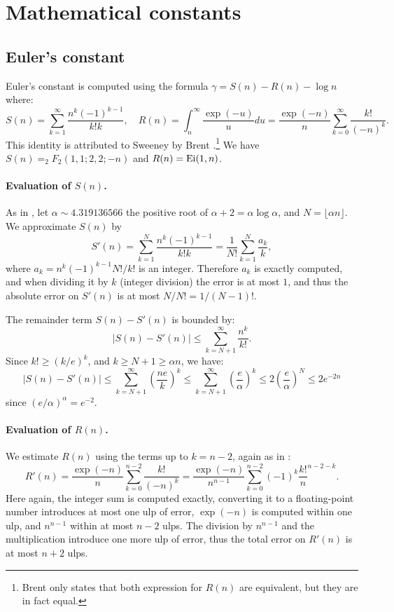 \documentclass[12pt]{amsart}
\begin{document}
\section{Mathematical constants}

\subsection{Euler's constant}

Euler's constant is computed using the formula $\gamma = S(n) - R(n) - \log n$
where:
\[ S(n) = \sum_{k=1}^{\infty} \frac{n^k (-1)^{k-1}}{k! k}, \quad
   R(n) = \int_n^{\infty} \frac{\exp(-u)}{u} du = \frac{\exp(-n)}{n}
	\sum_{k=0}^{\infty} \frac{k!}{(-n)^k}. \]
This identity is attributed to Sweeney by Brent \cite{Brent78}.\footnote{
Brent only states that both expression for $R(n)$ are equivalent, but
they are in fact equal.}
We have $S(n) = _2 F_2(1,1;2,2;-n)$ and $R(n) = {\rm Ei}(1, n)$.

\paragraph{Evaluation of $S(n)$.}
As in \cite{Brent78}, let $\alpha \sim 4.319136566$ the positive root
of $\alpha + 2 = \alpha \log \alpha$, and $N = \lfloor \alpha n \rfloor$.
We approximate $S(n)$ by
\[ S'(n) = \sum_{k=1}^{N} \frac{n^k (-1)^{k-1}}{k! k}
         = \frac{1}{N!} \sum_{k=1}^N \frac{a_k}{k}, \]
where $a_k = n^k (-1)^{k-1} N!/k!$ is an integer.
Therefore $a_k$ is exactly computed, and when dividing it by $k$
(integer division)
the error is at most $1$, and thus the absolute error on $S'(n)$ is
at most $N/N! = 1/(N-1)!$.

The remainder term $S(n) - S'(n)$ is bounded by:
\[ |S(n) - S'(n)| \le \sum_{k=N+1}^{\infty} \frac{n^k}{k!}. \]
Since $k! \ge (k/e)^k$, and $k \ge N+1 \ge \alpha n$, we have:
\[ |S(n) - S'(n)| \le \sum_{k=N+1}^{\infty} \left( \frac{n e}{k} \right)^k
                  \le \sum_{k=N+1}^{\infty} \left( \frac{e}{\alpha} \right)^k
                  \le 2 \left( \frac{e}{\alpha} \right)^N
                  \le 2 e^{-2n} \]
since $(e/\alpha)^{\alpha} = e^{-2}$.

\paragraph{Evaluation of $R(n)$.}
We estimate $R(n)$ using the terms up to $k=n-2$, again 
as in \cite{Brent78}:
\[ R'(n) = \frac{\exp(-n)}{n} \sum_{k=0}^{n-2} \frac{k!}{(-n)^k}
         = \frac{\exp(-n)}{n^{n-1}} \sum_{k=0}^{n-2} (-1)^k \frac{k!}
	n^{n-2-k}. \]
Here again, the integer sum is computed exactly, converting it to a 
floating-point number introduces at most one ulp of error,
$\exp(-n)$ is computed within one ulp,
and $n^{n-1}$ within at most $n-2$ ulps.
The division by $n^{n-1}$ and the multiplication introduce one more ulp of
error, thus the total error on $R'(n)$ is at most $n+2$ ulps.
\end{document}
